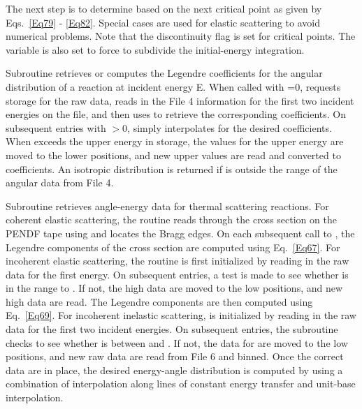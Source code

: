 The next step is to determine  based on the next critical
point as given by Eqs.~\ref{Eq79} - \ref{Eq82}.  Special cases are used
for elastic scattering to avoid numerical problems.  Note that the
discontinuity flag  is set for critical points.  The
 variable is also set to force  to subdivide the
initial-energy integration.

Subroutine 
retrieves or computes the Legendre coefficients
for the angular distribution of a reaction at incident energy E.  When
called with =0, 
requests storage for the raw data, reads in the File 4 information
for the first two incident energies on the file, and then
uses  to retrieve the corresponding
coefficients.  On subsequent entries with $>$0, 
simply interpolates for the desired coefficients.  When  exceeds
the upper energy in storage, the values for the upper energy are moved
to the lower positions, and new upper values are read and converted to
coefficients.  An isotropic distribution is returned if  is
outside the range of the angular data from File 4.

Subroutine 
retrieves angle-energy data for thermal scattering
reactions.  For coherent elastic scattering, the routine reads through the
cross section on the PENDF tape using  and locates the Bragg
edges.  On each subsequent call to , the Legendre components
of the cross section are computed using Eq.~\ref{Eq67}.  For incoherent
elastic scattering, the routine is first initialized by reading in the
raw data for the first energy.  On subsequent entries, a test is made
to see whether  is in the range  to .
If not, the high data are moved to the low positions, and new high data are
read.  The Legendre components are then computed using Eq.~\ref{Eq69}.  For
incoherent inelastic scattering,  is initialized by reading
in the raw data for the first two incident energies. On subsequent entries,
the subroutine checks to see whether  is between  and
.  If not, the data for  are moved to the low
positions, and new raw data are read from File 6 and binned.  Once the
correct data are in place, the desired energy-angle distribution is computed
by using a combination of interpolation along lines of constant energy
transfer and unit-base interpolation.

